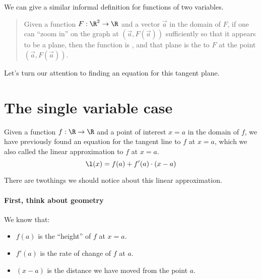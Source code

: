 \documentclass{ximera}
\begin{document}
We can give a similar informal definition for functions of two
variables.
\begin{quote}
  Given a function $F:\R^2\to\R$ and a vector $\vec{a}$ in the domain
  of $F$, if one can ``zoom in'' on the graph at $(\vec{a},
  F(\vec{a}))$ sufficiently so that it appears to be a plane, then the
  function is , and that plane is the  to $F$ at the point $(\vec{a},F(\vec{a}))$.
\end{quote}

Let's turn our attention to finding an equation for this tangent
plane.


\section{The single variable case}

Given a function $f : \R \to \R$ and a point of interest $x=a$ in the
domain of $f$, we have previously found an equation for the tangent
line to $f$ at $x=a$, which we also called the linear approximation to
$f$ at $x=a$.
\[
\l(x) = f(a) + f'(a) \cdot (x-a)
\]

There are twothings we should notice about this linear approximation.

\paragraph{First, think about geometry}  We know that:
\begin{itemize}
\item $f(a)$ is the ``height'' of $f$ at $x=a$.
\item $f'(a)$ is the rate of change of $f$ at $a$.
\item $(x-a)$ is the distance we have moved from the point $a$.
\end{itemize}
\end{document}
